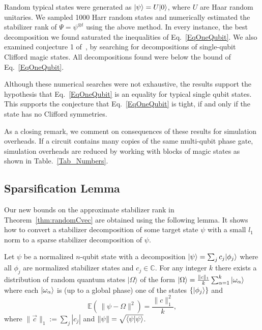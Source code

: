 Random typical states were generated as $\vert\psi\rangle=U\vert0\rangle$, where $U$ are Haar random unitaries.  We sampled 1000 Harr random states and numerically estimated the stabilizer rank of $\Psi=\psi^{\otimes t}$ using the above method. In every instance, the best decomposition we found saturated the inequalities of Eq.~\eqref{EqOneQubit}. We also examined conjecture 1 of~\cite{Bravyi16stabRank}, by searching for decompositions of single-qubit Clifford magic states. All decompositions found were below the bound of Eq.~\eqref{EqOneQubit}.

Although these numerical searches were not exhaustive, the results support the hypothesis that Eq.~\eqref{EqOneQubit} is an equality for typical single qubit states.  This supports the conjecture that Eq.~\eqref{EqOneQubit} is tight, if and only if the state has no Clifford symmetries. 

As a closing remark, we comment on consequences of these results for simulation overheads.  If a circuit contains many copies of the same multi-qubit phase gate, simulation overheads are reduced by working with blocks of magic states as shown in Table.~\ref{Tab_Numbers}.


\label{Sec_approx_stab_rank}

\subsection{Sparsification Lemma}
\label{Sec_Lemma_Proof}

Our new bounds  on the approximate stabilizer rank in Theorem~\ref{thm:randomCvec}
are obtained using the following   lemma.
It shows how to convert a stabilizer decomposition of some target state $\psi$ 
with a small $l_1$ norm to 
a sparse stabilizer decomposition of $\psi$.
\begin{lemma}[\bf Sparsification]
	\label{lem:randomCvec}
Let $\psi$ be a normalized $n$-qubit state with a decomposition $\vert\psi\rangle = \sum_j c_j \vert\phi_j\rangle $ where all $\phi_j $ are normalized stabilizer states and $c_j \in \mathbb{C}$.  For any integer $k$ there exists a distribution of random quantum states $|\Omega\rangle$ of the form 
$\vert\Omega\rangle=\frac{\|c\|_1}{k} \sum_{\alpha=1}^k \vert\omega_\alpha\rangle$ where each $\vert\omega_\alpha\rangle$ is (up to a global phase) one of the states $\{\vert\phi_j\rangle \}$ and
\begin{equation}
 \mathbb{E}\left( \, \| \psi -\Omega \|^2\right)  = \frac{\|c \|^2_1}{k},
\label{eq:meanomega}
\end{equation}
where $\|\vec{c} \|_1 := \sum_j |c_j|$ and $\| \psi \| = \sqrt{ \langle \psi\vert \psi\rangle }$.
\end{lemma}	

